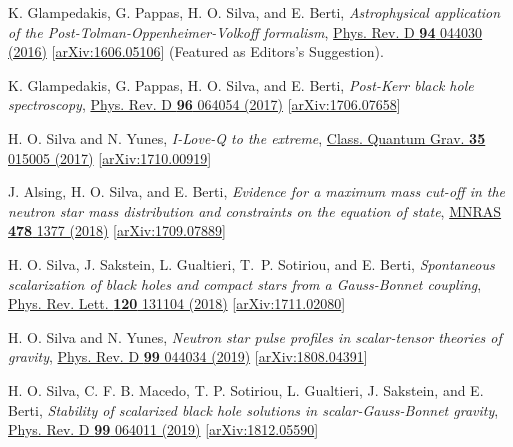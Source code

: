 \documentclass[10pt]{article}
\begin{document}
\begin{bibenum}
    \item K. Glampedakis, G. Pappas, H. O. Silva, and E. Berti,
    \emph{Astrophysical application of the Post-Tolman-Oppenheimer-Volkoff formalism},
    \href{http://journals.aps.org/prd/abstract/10.1103/PhysRevD.94.044030}{Phys. Rev. D {\bf94} 044030 (2016)}
    [\href{https://arxiv.org/abs/1606.05106}{arXiv:1606.05106}]
    (Featured as {\color{venetianred}\sc Editors's Suggestion}).
    \label{itm:astroptov}

    \item K. Glampedakis, G. Pappas, H. O. Silva, and E. Berti,
    \emph{Post-Kerr black hole spectroscopy},
    \href{https://journals.aps.org/prd/abstract/10.1103/PhysRevD.96.064054}{Phys. Rev. D {\bf96} 064054 (2017)}
    [\href{https://arxiv.org/abs/1706.07658}{arXiv:1706.07658}]
    \label{itm:postkerr}

    \item H. O. Silva and N. Yunes,
    \emph{I-Love-Q to the extreme},
    \href{http://iopscience.iop.org/article/10.1088/1361-6382/aa995a}{Class. Quantum Grav. {\bf35} 015005 (2017)}
    [\href{https://arxiv.org/abs/1710.00919}{arXiv:1710.00919}]

    \item J. Alsing, H. O. Silva, and E. Berti,
    \emph{Evidence for a maximum mass cut-off in the neutron star mass distribution and constraints on the equation of state},
    \href{https://academic.oup.com/mnras/article-abstract/478/1/1377/4987228?redirectedFrom=fulltext}{MNRAS {\bf478} 1377 (2018)}
    [\href{https://arxiv.org/abs/1709.07889}{arXiv:1709.07889}]

    \item H. O. Silva, J. Sakstein, L. Gualtieri, T.~P. Sotiriou, and E. Berti,
    \emph{Spontaneous scalarization of black holes and compact stars from a Gauss-Bonnet coupling},
    \href{https://journals.aps.org/prl/abstract/10.1103/PhysRevLett.120.131104}{Phys. Rev. Lett. {\bf120} 131104 (2018)}
    [\href{https://arxiv.org/abs/1711.02080}{arXiv:1711.02080}]
    \label{itm:edgb_sca}

    \item H. O. Silva and N. Yunes,
    \emph{Neutron star pulse profiles in scalar-tensor theories of gravity},
    \href{http://iopscience.iop.org/article/10.1088/1361-6382/aa995a}{Phys. Rev. D {\bf99} 044034 (2019)}
    [\href{https://arxiv.org/abs/1808.04391}{arXiv:1808.04391}]

    \item H. O. Silva, C. F. B. Macedo, T. P. Sotiriou, L. Gualtieri,
    	  J. Sakstein, and E. Berti,
	\emph{Stability of scalarized black hole solutions in scalar-Gauss-Bonnet gravity},
	\href{https://journals.aps.org/prd/abstract/10.1103/PhysRevD.99.064011}{Phys. Rev. D {\bf99} 064011 (2019)}
	[\href{https://arxiv.org/abs/1812.05590}{arXiv:1812.05590}]


\end{bibenum}
\end{document}
